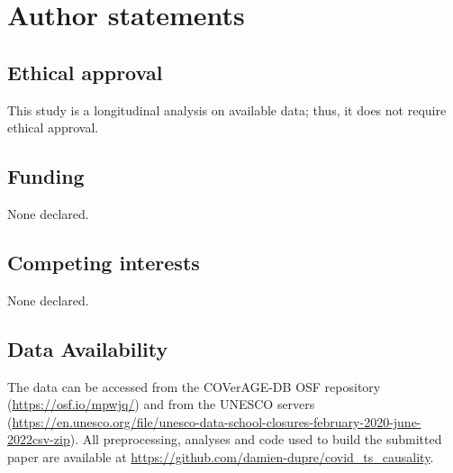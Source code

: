 \documentclass[]{interact}
\theoremstyle{plain}%
\theoremstyle{definition}
\theoremstyle{remark}
\begin{document}
\section{Author statements}\label{author-statements}

\subsection{Ethical approval}\label{ethical-approval}

This study is a longitudinal analysis on available data; thus, it does not require ethical approval.

\subsection{Funding}\label{funding}

None declared.

\subsection{Competing interests}\label{competing-interests}

None declared.

\subsection{Data Availability}\label{data-availability}

The data can be accessed from the COVerAGE-DB OSF repository (\url{https://osf.io/mpwjq/}) and from the UNESCO servers (\url{https://en.unesco.org/file/unesco-data-school-closures-february-2020-june-2022csv-zip}). All preprocessing, analyses and code used to build the submitted paper are available at \url{https://github.com/damien-dupre/covid_ts_causality}.



\end{document}
